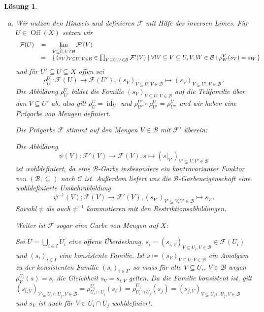 \documentclass[a4paper, 12pt, numbers=noendperiod, chapterprefix=true]{scrbook}
\theoremstyle{break}
\newtheorem{Loes}{L\"osung}
\theoremstyle{nonumberbreak}
\theoremstyle{nonumberplain}
\DeclareMathOperator{\Off}{Off}
\DeclareMathOperator{\id}{id}
\newcommand{\F}{\mathcal{F}} %
\begin{document}
\begin{Loes}
\begin{enumerate}[a)]%
 \item Wir nutzen den Hinweis und definieren $\F$ mit Hilfe des inversen Limes. F\"ur $U \in \Off(X)$ setzen wir 
 $$\begin{array}{rcl}
    \F(U) &\coloneqq& \varprojlim\limits_{V \subseteq U, V \in \mathcal{B}} \F'(V) \\
    &=& \{ \, (s_V)_{V \subseteq U, \, V \in \mathcal{B}} \in \prod_{V \subseteq U, V \in \mathcal{B}} \F'(V) \mid \forall W \subseteq V \subseteq U, V,W \in \mathcal{B}: \rho^V_W(s_V) = s_W \, \}
   \end{array}
$$
und f\"ur $U' \subseteq U \subseteq X$ offen sei
$$
\rho^U_{U'} \colon \F(U) \to \F(U'), (s_V)_{V \subseteq U, V \in \mathcal{B}} \mapsto (s_V)_{V \subseteq U', V \in \mathcal{B}}\,.
$$
Die Abbildung $\rho^U_{U'}$ bildet die Familie $(s_V)_{V \subseteq U, V \in \mathcal{B}}$ auf die Teilfamilie \"uber den $V \subseteq U'$ ab, also gilt $\rho^U_U = \id_U$ und $\rho^{U'}_{U''} \circ \rho^U _ {U'} = \rho^U_{U''}$
und wir haben eine Pr\"agarbe von Mengen definiert.

Die Pr\"agarbe $\F$ stimmt auf den Mengen $V \in \mathcal{B}$ mit $\F'$ \"uberein: 

Die Abbildung
$$
\psi(V)\colon \F'(V) \to \F(V), s \mapsto (s|_{V'})_{V' \subseteq V, V' \in \mathcal{B}}
$$
ist wohldefiniert, da eine $\mathcal{B}$-Garbe insbesondere ein kontravarianter Funktor von $(\mathcal{B}, \subseteq)$ nach $\mathcal{C}$ ist. Au\ss erdem liefert uns die $\mathcal{B}$-Garbeneigenschaft eine wohldefinierte Umkehrabbildung
$$
\psi^{-1}(V)\colon \F(V) \to \F'(V),  (s_{V'})_{V' \subseteq V, V' \in \mathcal{B}} \mapsto s_V\,.
$$
Sowohl $\psi$ als auch $\psi^{-1}$ kommutieren mit den Restriktionsabbildungen.

Weiter ist $\F$ sogar eine Garbe von Mengen auf $X$:

Sei $U = \bigcup_{i \in I} U_i$ eine offene \"Uberdeckung, $s_i = (s_{i,V} )_{V \subseteq U_i, V \in \mathcal{B}} \in \F(U_i)$ und $(s_i)_{i\in I}$ eine konsistente Familie. 
Ist $s \coloneqq (s_V)_{V \subseteq U, V \in \mathcal{B}}$  ein Amalgam zu der konsistenten Familie $(s_i)_{i \in I}$, so muss f\"ur alle $V \subseteq U_i$, $V \in \mathcal{B}$ wegen $\rho^{U_i}_V(s) = s_i$ die Gleichheit $s_V = s_{i,V}$ gelten. Da die Familie konsistent ist, gilt $(s_{i,V})_{V \subseteq U_i\cap U_j, V \in \mathcal{B}} = \rho^{U_i}_{U_i \cap U_j}(s_i) = \rho^{U_j}_{U_i \cap U_j}(s_j) = (s_{j,V} )_{V \subseteq U_i\cap U_j, V \in \mathcal{B}}$ und $s_V$ ist auch f\"ur $V \in U_i \cap U_j$ wohldefiniert. 


\end{enumerate}
\end{Loes}
\end{document}
